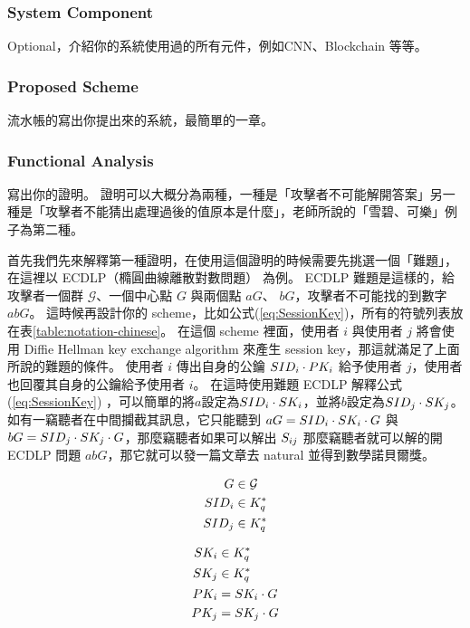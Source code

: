 \subsubsection{System Component}

Optional，介紹你的系統使用過的所有元件，例如CNN、Blockchain 等等。

\subsubsection{Proposed Scheme}

流水帳的寫出你提出來的系統，最簡單的一章。

\subsubsection{Functional Analysis}

寫出你的證明。
證明可以大概分為兩種，一種是「攻擊者不可能解開答案」另一種是「攻擊者不能猜出處理過後的值原本是什麼」，老師所說的「雪碧、可樂」例子為第二種。

首先我們先來解釋第一種證明，在使用這個證明的時候需要先挑選一個「難題」，在這裡以 ECDLP（橢圓曲線離散對數問題） 為例。
ECDLP 難題是這樣的，給攻擊者一個群 $\mathcal{G}$、一個中心點 $G$ 與兩個點 $aG$、 $bG$，攻擊者不可能找的到數字 $abG$。
這時候再設計你的 scheme，比如公式(\ref{eq:SessionKey})，所有的符號列表放在表\ref{table:notation-chinese}。
在這個 scheme 裡面，使用者 $i$ 與使用者 $j$ 將會使用 Diffie Hellman key exchange algorithm 來產生 session key，那這就滿足了上面所說的難題的條件。
使用者 $i$ 傳出自身的公鑰 $SID_{i}\cdot{}PK_{i}$ 給予使用者 $j$，使用者也回覆其自身的公鑰給予使用者 $i$。
在這時使用難題 ECDLP 解釋公式 (\ref{eq:SessionKey}) ，可以簡單的將$a$設定為$SID_{i}\cdot{}SK_{i}$，並將$b$設定為$SID_{j}\cdot{}SK_{j}$。
如有一竊聽者在中間攔截其訊息，它只能聽到 $aG = SID_{i}\cdot{}SK_{i}\cdot{}G$ 與 $bG = SID_{j}\cdot{}SK_{j}\cdot{}G$，那麼竊聽者如果可以解出 $S_{ij}$ 那麼竊聽者就可以解的開 ECDLP 問題 $abG$，那它就可以發一篇文章去 natural 並得到數學諾貝爾獎。

\begin{minipage}{.48\textwidth}
	\begin{align}
		G       & \in \mathcal{G} \nonumber  \\
		SID_{i} & \in K^{*}_{q} \nonumber \\
		SID_{j} & \in K^{*}_{q} \nonumber
	\end{align}
\end{minipage}
\begin{minipage}{.48\textwidth}
	\begin{align}
		SK_{i} & \in K^{*}_{q} \nonumber     \\
		SK_{j} & \in K^{*}_{q} \nonumber     \\
		PK_{i} & = SK_{i}\cdot{}G \nonumber \\
		PK_{j} & = SK_{j}\cdot{}G \nonumber
	\end{align}
\end{minipage}

